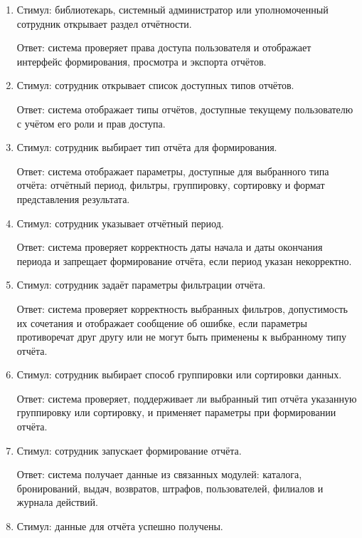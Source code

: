 \documentclass[12pt,a4paper]{article}
\begin{document}
	\begin{enumerate}
		\item Стимул: библиотекарь, системный администратор или уполномоченный
		сотрудник открывает раздел отчётности.
		
		Ответ: система проверяет права доступа пользователя и отображает интерфейс
		формирования, просмотра и экспорта отчётов.
		
		\item Стимул: сотрудник открывает список доступных типов отчётов.
		
		Ответ: система отображает типы отчётов, доступные текущему пользователю
		с учётом его роли и прав доступа.
		
		\item Стимул: сотрудник выбирает тип отчёта для формирования.
		
		Ответ: система отображает параметры, доступные для выбранного типа отчёта:
		отчётный период, фильтры, группировку, сортировку и формат представления
		результата.
		
		\item Стимул: сотрудник указывает отчётный период.
		
		Ответ: система проверяет корректность даты начала и даты окончания периода
		и запрещает формирование отчёта, если период указан некорректно.
		
		\item Стимул: сотрудник задаёт параметры фильтрации отчёта.
		
		Ответ: система проверяет корректность выбранных фильтров, допустимость их
		сочетания и отображает сообщение об ошибке, если параметры противоречат
		друг другу или не могут быть применены к выбранному типу отчёта.
		
		\item Стимул: сотрудник выбирает способ группировки или сортировки данных.
		
		Ответ: система проверяет, поддерживает ли выбранный тип отчёта указанную
		группировку или сортировку, и применяет параметры при формировании отчёта.
		
		\item Стимул: сотрудник запускает формирование отчёта.
		
		Ответ: система получает данные из связанных модулей: каталога, бронирований,
		выдач, возвратов, штрафов, пользователей, филиалов и журнала действий.
		
		\item Стимул: данные для отчёта успешно получены.
		

\end{enumerate}
\end{document}
